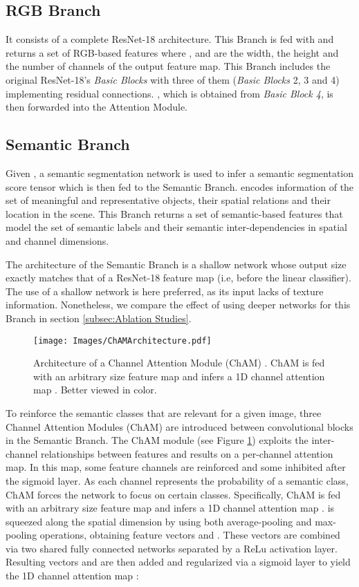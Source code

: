 \documentclass[review, 3p, sort&compress]{elsarticle}
\begin{document}
\subsection{RGB Branch}
It consists of a complete ResNet-18 architecture. This Branch is fed with  and returns a set of RGB-based features  where ,  and  are the width, the height and the number of channels of the output feature map. This Branch includes the original ResNet-18's \textit{Basic Blocks} with three of them (\textit{Basic Blocks} 2, 3 and 4) implementing residual connections. , which is obtained from \textit{Basic Block 4}, is then forwarded into the Attention Module.

\subsection{Semantic Branch}
Given , a semantic segmentation network is used to infer a semantic segmentation score tensor  which is then fed to the Semantic Branch.  encodes information of the set of meaningful and representative objects, their spatial relations and their location in the scene. This Branch returns a set of semantic-based features  that model the set of semantic labels and their semantic inter-dependencies in spatial and channel dimensions. 

The architecture of the Semantic Branch is a shallow network whose output size exactly matches that of a ResNet-18 feature map (i.e, before the linear classifier). The use of a shallow network is here preferred, as its input  lacks of texture information. Nonetheless, we compare the effect of using deeper networks for this Branch in section \ref{subsec:Ablation Studies}. 

\begin{figure}[t!]
    \centering
    \texttt{[image: Images/ChAMArchitecture.pdf]}
    \caption{Architecture of a Channel Attention Module (ChAM) \cite{woo2018cbam}. ChAM is fed with an arbitrary size feature map  and infers a 1D channel attention map . Better viewed in color.}
    \label{fig:Channel Attention Module Architecture}
\end{figure}


To reinforce the semantic classes that are relevant for a given image, three Channel Attention Modules (ChAM) \cite{woo2018cbam} are introduced between convolutional blocks in the Semantic Branch. The ChAM module (see Figure \ref{fig:Channel Attention Module Architecture}) exploits the inter-channel relationships between features and results on a per-channel attention map. In this map, some feature channels are reinforced and some inhibited after the sigmoid layer. As each channel represents the probability of a semantic class, ChAM forces the network to focus on certain classes. Specifically, ChAM is fed with an arbitrary size feature map  and infers a 1D channel attention map .  is squeezed along the spatial dimension by using both average-pooling and max-pooling operations, obtaining feature vectors  and . These vectors are combined via two shared fully connected networks separated by a ReLu activation layer. Resulting vectors  and  are then added and regularized via a sigmoid layer to yield the 1D channel attention map :
\end{document}

